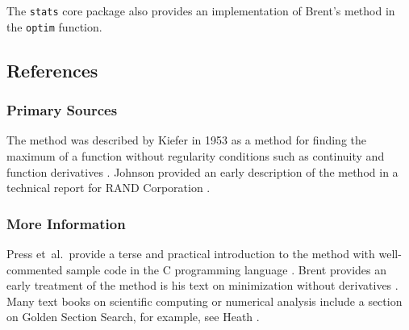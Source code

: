 The \texttt{stats} core package also provides an implementation of Brent's method in the \texttt{optim} function.

\subsection{References}

\subsubsection{Primary Sources}
The method was described by Kiefer in 1953 as a method for finding the maximum of a function without regularity conditions such as continuity and function derivatives \cite{Kiefer1953}.
Johnson provided an early description of the method in a technical report for RAND Corporation \cite{Johnson1955}.

\subsubsection{More Information}
Press et~al.\ provide a terse and practical introduction to the method with well-commented sample code in the C programming language \cite{Press2007}.
Brent provides an early treatment of the method is his text on minimization without derivatives \cite{Brent1973}.
Many text books on scientific computing or numerical analysis include a section on Golden Section Search, for example, see Heath \cite{Heath2002}.

